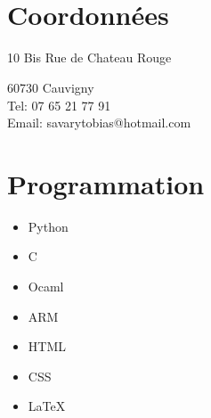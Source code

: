 \documentclass[10pt, oneside, a4paper, titlepage]{article}
\begin{document}
    \begin{tcolorbox}
        \vspace*{0.2cm}
        \hspace*{0.7mm}
        \begin{minipage}[t]{7cm}
            \begin{spacing}{0.95}
            \vspace*{-0.5cm}
            \begin{tcolorbox}[grow to left by = 0.6cm, colback = gray!25, colframe = white]
                
                \section*{\\Coordonnées}
                \hspace*{0.4cm}
                10 Bis Rue de Chateau Rouge

                \hspace*{0.4cm}
                \vspace*{0.2cm}
                60730 Cauvigny\\
                \hspace*{0.4cm}
                Tel: 07 65 21 77 91\\
                \hspace*{0.4cm}
                Email: savarytobias@hotmail.com\\

                \section*{Programmation}
                \begin{itemize}
                    \item Python
                    \item C
                    \item Ocaml
                    \item ARM
                    \item HTML
                    \item CSS
                    \item \LaTeX
                \end{itemize}
                \vspace*{1mm}

\end{tcolorbox}
\end{spacing}
\end{minipage}
\end{tcolorbox}
\end{document}

